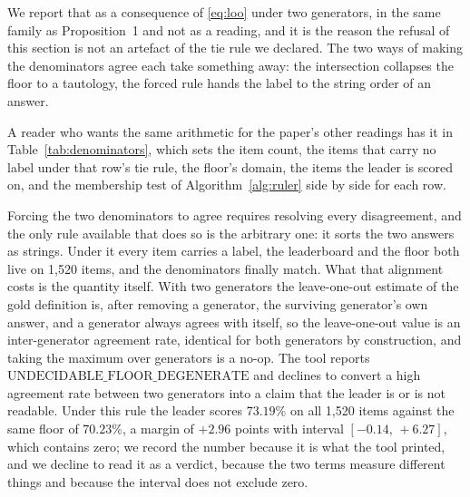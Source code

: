 \documentclass{article}
\newcommand{\ids}[1]{\texttt{\small #1}} %
\begin{document}
We report that as a consequence of \eqref{eq:loo} under two generators, in the same family as Proposition~1 and not as a reading, and it is the reason the refusal of this section is not an artefact of the tie rule we declared. The two ways of making the denominators agree each take something away: the intersection collapses the floor to a tautology, the forced rule hands the label to the string order of an answer.

A reader who wants the same arithmetic for the paper's other readings has it in Table~\ref{tab:denominators}, which sets the item count, the items that carry no label under that row's tie rule, the floor's domain, the items the leader is scored on, and the membership test of Algorithm~\ref{alg:ruler} side by side for each row.

\begin{table}[htbp] \centering \footnotesize

\caption{Where each reading's numbers are counted. Each cell is read from the report field of the same name: \ids{n\_items} for the item count, \ids{gold\_tie\_items} for the items on which that row's tie rule produces no label, \ids{loo\_domain\_size} for the domain of the leave-one-out floor, \ids{leaderboard\_scored\_items} for the items the reported leader is actually scored on, \ids{same\_domain\_as\_floor} for the membership test, and \ids{verdict} for the word the arm returns. \emph{Same?} is that membership test rather than an equality of counts, because two sets of the same size can carry different members: the preference row has 511 items on each side and different members, and the arm refuses it on that basis. The table prints counts; the membership test behind the last column uses the digests stored in the reports rather than these counts. The panel arm's report carries no candidate-item field, so its row is read off the four fields it does carry.}
\label{tab:denominators}
\end{table}

Forcing the two denominators to agree requires resolving every disagreement, and the only rule available that does so is the arbitrary one: it sorts the two answers as strings. Under it every item carries a label, the leaderboard and the floor both live on 1,520 items, and the denominators finally match. What that alignment costs is the quantity itself. With two generators the leave-one-out estimate of the gold definition is, after removing a generator, the surviving generator's own answer, and a generator always agrees with itself, so the leave-one-out value is an inter-generator agreement rate, identical for both generators by construction, and taking the maximum over generators is a no-op. The tool reports $\mathrm{UNDECIDABLE\_FLOOR\_DEGENERATE}$ and declines to convert a high agreement rate between two generators into a claim that the leader is or is not readable. Under this rule the leader scores $73.19\%$ on all 1,520 items against the same floor of $70.23\%$, a margin of $+2.96$ points with interval $[-0.14,\,+6.27]$, which contains zero; we record the number because it is what the tool printed, and we decline to read it as a verdict, because the two terms measure different things and because the interval does not exclude zero.
\end{document}
